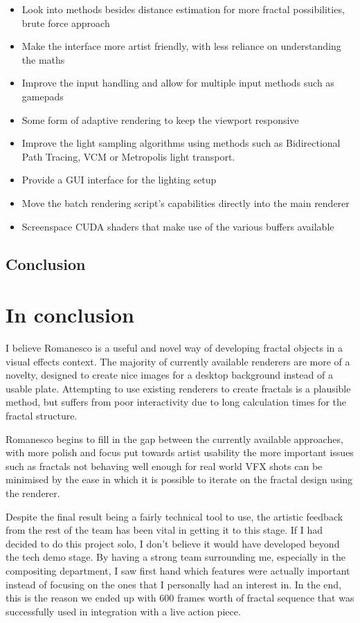 \documentclass[11pt,a4paper,final,notitlepage]{report}
\begin{document}
\begin{itemize}
	\item Look into methods besides distance estimation for more fractal possibilities, brute force approach
	\item Make the interface more artist friendly, with less reliance on understanding the maths
	\item Improve the input handling and allow for multiple input methods such as gamepads
	\item Some form of adaptive rendering to keep the viewport responsive
	\item Improve the light sampling algorithms using methods such as Bidirectional Path Tracing, VCM or Metropolis light transport.
	\item Provide a GUI interface for the lighting setup
	\item Move the batch rendering script's capabilities directly into the main renderer
	\item Screenspace CUDA shaders that make use of the various buffers available	
\end{itemize}


\chapter{Conclusion}

\part{In conclusion} I believe Romanesco is a useful and novel way of developing fractal objects in a visual effects context. The majority of currently available renderers are more of a novelty, designed to create nice images for a desktop background instead of a usable plate. Attempting to use existing renderers to create fractals is a plausible method, but suffers from poor interactivity due to long calculation times for the fractal structure.

Romanesco begins to fill in the gap between the currently available approaches, with more polish and focus put towards artist usability the more important issues such as fractals not behaving well enough for real world VFX shots can be minimised by the ease in which it is possible to iterate on the fractal design using the renderer.

Despite the final result being a fairly technical tool to use, the artistic feedback from the rest of the team has been vital in getting it to this stage. If I had decided to do this project solo, I don't believe it would have developed beyond the tech demo stage. By having a strong team surrounding me, especially in the compositing department, I saw first hand which features were actually important instead of focusing on the ones that I personally had an interest in. In the end, this is the reason we ended up with 600 frames worth of fractal sequence that was successfully used in integration with a live action piece.
\end{document}
